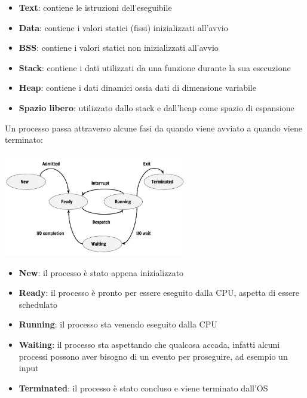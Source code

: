 \documentclass{article}
\begin{document}
    \begin{itemize}
        \item \textbf{Text}:
            contiene le istruzioni dell'eseguibile
        \item  \textbf{Data}:
            contiene i valori statici (fissi) inizializzati all'avvio
        \item  \textbf{BSS}:
            contiene i valori statici non inizializzati all'avvio
        \item \textbf{Stack}:
            contiene i dati utilizzati da una funzione durante la sua esecuzione
        \item \textbf{Heap}:
            contiene i dati dinamici ossia dati di dimensione variabile
        \item \textbf{Spazio libero}:
            utilizzato dallo stack e dall'heap come spazio di espansione  
    \end{itemize}
    Un processo passa attraverso alcune fasi da quando viene avviato a quando viene terminato:
%
    \begin{center}
        \includegraphics[width=0.6\textwidth]{immagini/Process-State-Diagram.jpg}
    \end{center}

    \begin{itemize}
        \item \textbf{New}:
            il processo è stato appena inizializzato
        \item \textbf{Ready}:
            il processo è pronto per essere eseguito dalla CPU, aspetta di essere schedulato
        \item \textbf{Running}:
            il processo sta venendo eseguito dalla CPU
        \item \textbf{Waiting}:
            il processo sta aspettando che qualcosa accada, infatti alcuni processi possono
            aver bisogno di un evento per proseguire, ad esempio un input
        \item \textbf{Terminated}:
            il processo è stato concluso e viene terminato dall'OS
    \end{itemize}
\end{document}
